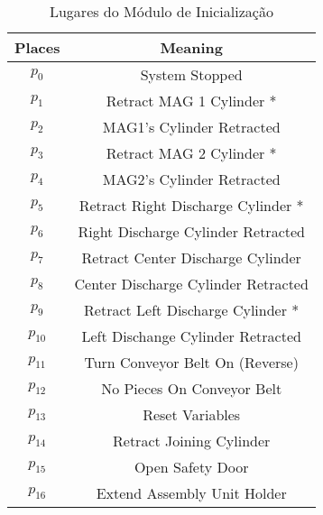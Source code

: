 \begin{table}[htbp]
\caption{Lugares do Módulo de Inicialização}
\centering
\begin{tabular}{c|c}
Places & Meaning\\
\hline
\hyperlink{partialNet:p0}{\hypertarget{partialTable:p0m1}{$p_{0}$}} & System Stopped\\
\hyperlink{partialNet:p1}{\hypertarget{partialTable:p1}{$p_{1}$}} & Retract MAG 1 Cylinder *\\
\hyperlink{partialNet:p2}{\hypertarget{partialTable:p2}{$p_{2}$}} & MAG1's Cylinder Retracted\\
\hyperlink{partialNet:p3}{\hypertarget{partialTable:p3}{$p_{3}$}} & Retract MAG 2 Cylinder *\\
\hyperlink{partialNet:p4}{\hypertarget{partialTable:p4}{$p_{4}$}} & MAG2's Cylinder Retracted\\
\hyperlink{partialNet:p5}{\hypertarget{partialTable:p5}{$p_{5}$}} & Retract Right Discharge Cylinder *\\
\hyperlink{partialNet:p6}{\hypertarget{partialTable:p6}{$p_{6}$}} & Right Discharge Cylinder Retracted\\
\hyperlink{partialNet:p7}{\hypertarget{partialTable:p7}{$p_{7}$}} & Retract Center Discharge Cylinder\\
\hyperlink{partialNet:p8}{\hypertarget{partialTable:p8}{$p_{8}$}} & Center Discharge Cylinder Retracted\\
\hyperlink{partialNet:p9}{\hypertarget{partialTable:p9}{$p_{9}$}} & Retract Left Discharge Cylinder *\\
\hyperlink{partialNet:p10}{\hypertarget{partialTable:p10}{$p_{10}$}} & Left Dischange Cylinder Retracted\\
\hyperlink{partialNet:p11}{\hypertarget{partialTable:p11}{$p_{11}$}} & Turn Conveyor Belt On (Reverse)\\
\hyperlink{partialNet:p12}{\hypertarget{partialTable:p12}{$p_{12}$}} & No Pieces On Conveyor Belt\\
\hyperlink{partialNet:p13}{\hypertarget{partialTable:p13}{$p_{13}$}} & Reset Variables\footnotemark\\
\hyperlink{partialNet:p14}{\hypertarget{partialTable:p14}{$p_{14}$}} & Retract Joining Cylinder\\
\hyperlink{partialNet:p15}{\hypertarget{partialTable:p15}{$p_{15}$}} & Open Safety Door\\
\hyperlink{partialNet:p16}{\hypertarget{partialTable:p16}{$p_{16}$}} & Extend Assembly Unit Holder\\

\end{tabular}
\end{table}
